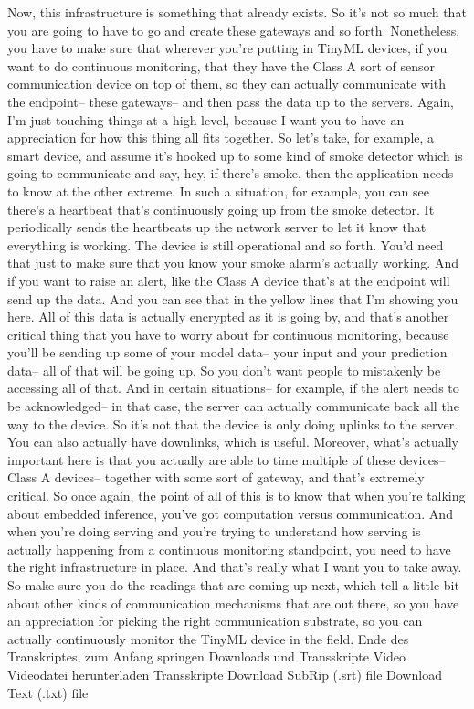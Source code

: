 {{{{{{{{    Now, this infrastructure is something that already exists.
    So it's not so much that you are going to have to go and create these gateways
    and so forth.
    Nonetheless, you have to make sure that wherever
    you're putting in TinyML devices, if you want to do continuous monitoring,
    that they have the Class A sort of sensor communication device on top
    of them, so they can actually communicate with the endpoint--
    these gateways-- and then pass the data up to the servers.
    Again, I'm just touching things at a high level,
    because I want you to have an appreciation for how this thing all
    fits together.
    So let's take, for example, a smart device, and assume it's
    hooked up to some kind of smoke detector which
    is going to communicate and say, hey, if there's smoke,
    then the application needs to know at the other extreme.
    In such a situation, for example, you can
    see there's a heartbeat that's continuously
    going up from the smoke detector.
    It periodically sends the heartbeats up the network server
    to let it know that everything is working.
    The device is still operational and so forth.
    You'd need that just to make sure that you know your smoke alarm's actually
    working.
    And if you want to raise an alert, like the Class
    A device that's at the endpoint will send up the data.
    And you can see that in the yellow lines that I'm showing you here.
    All of this data is actually encrypted as it is going by,
    and that's another critical thing that you
    have to worry about for continuous monitoring,
    because you'll be sending up some of your model data-- your input
    and your prediction data-- all of that will be going up.
    So you don't want people to mistakenly be accessing all of that.
    And in certain situations-- for example, if the alert
    needs to be acknowledged-- in that case, the server
    can actually communicate back all the way to the device.
    So it's not that the device is only doing uplinks to the server.
    You can also actually have downlinks, which is useful.
    Moreover, what's actually important here is
    that you actually are able to time multiple of these devices--
    Class A devices-- together with some sort of gateway,
    and that's extremely critical.
    So once again, the point of all of this is
    to know that when you're talking about embedded inference,
    you've got computation versus communication.
    And when you're doing serving and you're trying
    to understand how serving is actually happening from a continuous monitoring
    standpoint, you need to have the right infrastructure in place.
    And that's really what I want you to take away.
    So make sure you do the readings that are coming up
    next, which tell a little bit about other kinds of communication mechanisms
    that are out there, so you have an appreciation for picking
    the right communication substrate, so you can actually continuously monitor
    the TinyML device in the field.
    Ende des Transkriptes, zum Anfang springen
    Downloads und Transskripte
    Video
    Videodatei herunterladen
    Transskripte
    Download SubRip (.srt) file
    Download Text (.txt) file 
  
}}}}}}}}
